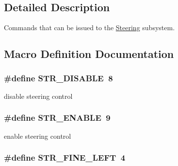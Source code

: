 \subsection{Detailed Description}
Commands that can be issued to the \hyperlink{classSteering}{Steering} subsystem. 

\subsection{Macro Definition Documentation}
\hypertarget{group__steering__commands_gafee4d732bb6cb1141150ea6c07a4cf7e}{
\subsubsection[{S\-T\-R\-\_\-\-D\-I\-S\-A\-B\-L\-E}]{\setlength{\rightskip}{0pt plus 5cm}\#define S\-T\-R\-\_\-\-D\-I\-S\-A\-B\-L\-E~8}}\label{group__steering__commands_gafee4d732bb6cb1141150ea6c07a4cf7e}
disable steering control \hypertarget{group__steering__commands_gac780e9695ae28682e0fe8bacf39ad828}{
\subsubsection[{S\-T\-R\-\_\-\-E\-N\-A\-B\-L\-E}]{\setlength{\rightskip}{0pt plus 5cm}\#define S\-T\-R\-\_\-\-E\-N\-A\-B\-L\-E~9}}\label{group__steering__commands_gac780e9695ae28682e0fe8bacf39ad828}
enable steering control \hypertarget{group__steering__commands_gaea8bf1d4bcf9c8b6bfd778fb81f91eab}{
\subsubsection[{S\-T\-R\-\_\-\-F\-I\-N\-E\-\_\-\-L\-E\-F\-T}]{\setlength{\rightskip}{0pt plus 5cm}\#define S\-T\-R\-\_\-\-F\-I\-N\-E\-\_\-\-L\-E\-F\-T~4}}\label{group__steering__commands_gaea8bf1d4bcf9c8b6bfd778fb81f91eab}
